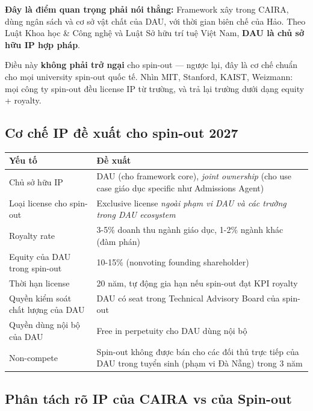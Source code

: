 \documentclass[11pt,a4paper]{article}
\begin{document}
\textbf{Đây là điểm quan trọng phải nói thẳng:} Framework xây trong CAIRA, dùng
ngân sách và cơ sở vật chất của DAU, với thời gian biên chế của Hảo. Theo Luật
Khoa học \& Công nghệ và Luật Sở hữu trí tuệ Việt Nam, \textbf{DAU là chủ sở hữu
IP hợp pháp}.

Điều này \textbf{không phải trở ngại} cho spin-out --- ngược lại, đây là cơ chế
chuẩn cho mọi university spin-out quốc tế. Nhìn MIT, Stanford, KAIST, Weizmann:
mọi công ty spin-out đều license IP từ trường, và trả lại trường dưới dạng equity
+ royalty.

\subsection{Cơ chế IP đề xuất cho spin-out 2027}

\begin{tabularx}{\linewidth}{@{}p{3.5cm} X@{}}
\toprule
\textbf{Yếu tố} & \textbf{Đề xuất} \\
\midrule
Chủ sở hữu IP & DAU (cho framework core), \textit{joint ownership} (cho use case giáo dục specific như Admissions Agent) \\
Loại license cho spin-out & Exclusive license \textit{ngoài phạm vi DAU và các trường trong DAU ecosystem} \\
Royalty rate & 3-5\% doanh thu ngành giáo dục, 1-2\% ngành khác (đàm phán) \\
Equity của DAU trong spin-out & 10-15\% (nonvoting founding shareholder) \\
Thời hạn license & 20 năm, tự động gia hạn nếu spin-out đạt KPI royalty \\
Quyền kiểm soát chất lượng của DAU & DAU có seat trong Technical Advisory Board của spin-out \\
Quyền dùng nội bộ của DAU & Free in perpetuity cho DAU dùng nội bộ \\
Non-compete & Spin-out không được bán cho các đối thủ trực tiếp của DAU trong tuyển sinh (phạm vi Đà Nẵng) trong 3 năm \\
\bottomrule
\end{tabularx}

\subsection{Phân tách rõ IP của CAIRA vs của Spin-out}
\end{document}
